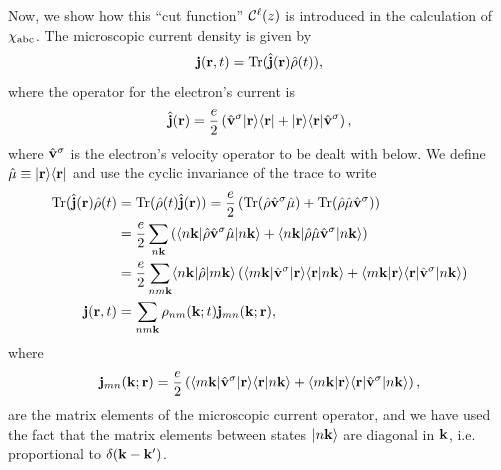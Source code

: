 \documentclass[floatfix,prb,aps,superscriptaddress,11pt,preprint,letterpaper]{revtex4}
\begin{document}
Now, we show how this ``cut function'' ${\mathbf{\cal C}}^\ell(z)$ is introduced in
the calculation of $\chi_{\mathrm{a}\mathrm{b}\mathrm{c}}$. 
The microscopic current density is given by
\begin{equation}\label{jmic}
\mathbf{j}(\mathbf{r},t)=\mathrm{Tr}(\hat{\mathbf{j}}(\mathbf{r})\hat\rho(t)),
\end{equation}
where the operator for the electron's current is
\begin{equation}\label{hatjmic}
\hat{\mathbf{j}}(\mathbf{r})=\frac{e}{2}\left(\hat{\mathbf{v}}^\sigma| \mathbf{r} \rangle\langle \mathbf{r} |
+| \mathbf{r} \rangle\langle \mathbf{r} |\hat{\mathbf{v}}^\sigma\right), 
\end{equation}
where $\hat{\mathbf{v}}^\sigma$ is the electron's velocity operator to be dealt
with below. We define
$\hat\mu\equiv| \mathbf{r} \rangle\langle \mathbf{r} |$ and use the cyclic invariance of
the trace to write
\begin{align}\label{jmic2}
\mathrm{Tr}(\hat{\mathbf{j}}(\mathbf{r})\hat\rho(t)&=\mathrm{Tr}(\hat\rho(t)\hat{\mathbf{j}}(\mathbf{r}))=
\frac{e}{2}
\left(
\mathrm{Tr}(\hat\rho\hat{\mathbf{v}}^\sigma\hat\mu)
+
\mathrm{Tr}(\hat\rho\hat\mu\hat{\mathbf{v}}^\sigma)
\right)
\nonumber\\
&=
\frac{e}{2}
\sum_{n\mathbf{k}}
\left(
\langle n\mathbf{k} |\hat\rho\hat{\mathbf{v}}^\sigma\hat\mu| n\mathbf{k} \rangle
+
\langle n\mathbf{k} |\hat\rho\hat\mu\hat{\mathbf{v}}^\sigma| n\mathbf{k} \rangle
\right)
\nonumber\\
&=
\frac{e}{2}
\sum_{nm\mathbf{k}}
\langle n\mathbf{k} |\hat\rho| m\mathbf{k} \rangle
\left(
\langle m\mathbf{k} |\hat{\mathbf{v}}^\sigma| \mathbf{r} \rangle\langle {\mathbf{r}} | {n\mathbf{k}} \rangle
+
\langle {m\mathbf{k}} | {\mathbf{r}} \rangle\langle \mathbf{r} |\hat{\mathbf{v}}^\sigma| n\mathbf{k} \rangle
\right)
\nonumber\\
\mathbf{j}(\mathbf{r},t)&=
\sum_{nm\mathbf{k}}
\rho_{nm}(\mathbf{k};t)\mathbf{j}_{mn}(\mathbf{k};\mathbf{r}),
\end{align}
where
\begin{equation}\label{jmic3}
\mathbf{j}_{mn}(\mathbf{k};\mathbf{r})=
\frac{e}{2}
\left(
\langle m\mathbf{k} |\hat{\mathbf{v}}^\sigma| \mathbf{r} \rangle\langle {\mathbf{r}} | {n\mathbf{k}} \rangle
+
\langle {m\mathbf{k}} | {\mathbf{r}} \rangle\langle \mathbf{r} |\hat{\mathbf{v}}^\sigma| n\mathbf{k} \rangle
\right),
\end{equation}
are the matrix elements of the microscopic current operator,
and we have used the fact that the matrix elements between states $| n\mathbf{k} \rangle$
are diagonal in $\mathbf{k}$, i.e. proportional to $\delta(\mathbf{k}-\mathbf{k}')$.
\end{document}
